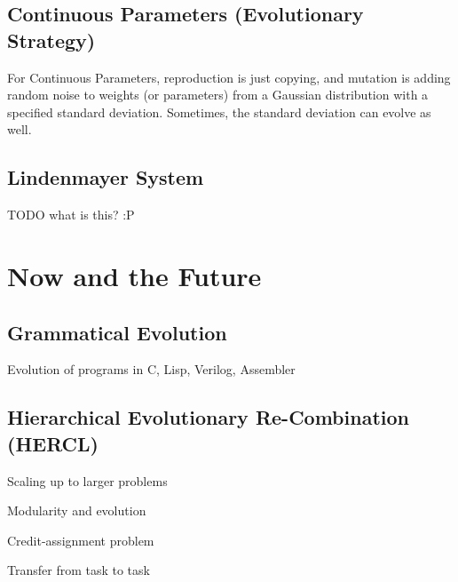 \subsection{Continuous Parameters (Evolutionary Strategy)}
For Continuous Parameters, reproduction is just copying, and mutation is adding
random noise to weights (or parameters) from a Gaussian distribution with a
specified standard deviation. Sometimes, the standard deviation can evolve as
well.

\subsection{Lindenmayer System}
TODO what is this? :P

\section{Now and the Future}
\subsection{Grammatical Evolution}
Evolution of programs in C, Lisp, Verilog, Assembler

\subsection{Hierarchical Evolutionary Re-Combination (HERCL)}
Scaling up to larger problems

Modularity and evolution

Credit-assignment problem

Transfer from task to task
